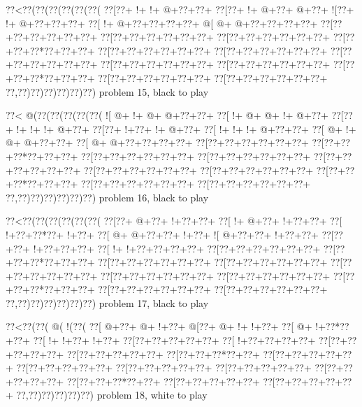 \vbox{\vbox{\goo
\0??<\0??(\0??(\0??(\0??(\0??(\0??(
\0??[\0??+\- !+\- !+\- @+\0??+\0??+
\0??[\0??+\- !+\- @+\0??+\- @+\0??+
\- ![\0??+\- !+\- @+\0??+\0??+\0??+
\0??[\- !+\- @+\0??+\0??+\0??+\0??+
\- @[\- @+\- @+\0??+\0??+\0??+\0??+
\0??[\0??+\0??+\0??+\0??+\0??+\0??+
\0??[\0??+\0??+\0??+\0??+\0??+\0??+
\0??[\0??+\0??+\0??+\0??+\0??+\0??+
\0??[\0??+\0??+\0??*\0??+\0??+\0??+
\0??[\0??+\0??+\0??+\0??+\0??+\0??+
\0??[\0??+\0??+\0??+\0??+\0??+\0??+
\0??[\0??+\0??+\0??+\0??+\0??+\0??+
\0??[\0??+\0??+\0??+\0??+\0??+\0??+
\0??[\0??+\0??+\0??+\0??+\0??+\0??+
\0??[\0??+\0??+\0??*\0??+\0??+\0??+
\0??[\0??+\0??+\0??+\0??+\0??+\0??+
\0??[\0??+\0??+\0??+\0??+\0??+\0??+
\0??,\0??)\0??)\0??)\0??)\0??)\0??)
}
\hfil problem 15, black to play\hfil\break
}

\vbox{\vbox{\goo
\0??<\- @(\0??(\0??(\0??(\0??(\0??(
\- ![\- @+\- !+\- @+\- @+\0??+\0??+
\0??[\- !+\- @+\- @+\- !+\- @+\0??+
\0??[\0??+\- !+\- !+\- !+\- @+\0??+
\0??[\0??+\- !+\0??+\- !+\- @+\0??+
\0??[\- !+\- !+\- !+\- @+\0??+\0??+
\0??[\- @+\- !+\- @+\- @+\0??+\0??+
\0??[\- @+\- @+\0??+\0??+\0??+\0??+
\0??[\0??+\0??+\0??+\0??+\0??+\0??+
\0??[\0??+\0??+\0??*\0??+\0??+\0??+
\0??[\0??+\0??+\0??+\0??+\0??+\0??+
\0??[\0??+\0??+\0??+\0??+\0??+\0??+
\0??[\0??+\0??+\0??+\0??+\0??+\0??+
\0??[\0??+\0??+\0??+\0??+\0??+\0??+
\0??[\0??+\0??+\0??+\0??+\0??+\0??+
\0??[\0??+\0??+\0??*\0??+\0??+\0??+
\0??[\0??+\0??+\0??+\0??+\0??+\0??+
\0??[\0??+\0??+\0??+\0??+\0??+\0??+
\0??,\0??)\0??)\0??)\0??)\0??)\0??)
}
\hfil problem 16, black to play\hfil\break
}

\vbox{\vbox{\goo
\0??<\0??(\0??(\0??(\0??(\0??(\0??(
\0??[\0??+\- @+\0??+\- !+\0??+\0??+
\0??[\- !+\- @+\0??+\- !+\0??+\0??+
\0??[\- !+\0??+\0??*\0??+\- !+\0??+
\0??[\- @+\- @+\0??+\0??+\- !+\0??+
\- ![\- @+\0??+\0??+\- !+\0??+\0??+
\0??[\0??+\0??+\- !+\0??+\0??+\0??+
\0??[\- !+\- !+\0??+\0??+\0??+\0??+
\0??[\0??+\0??+\0??+\0??+\0??+\0??+
\0??[\0??+\0??+\0??*\0??+\0??+\0??+
\0??[\0??+\0??+\0??+\0??+\0??+\0??+
\0??[\0??+\0??+\0??+\0??+\0??+\0??+
\0??[\0??+\0??+\0??+\0??+\0??+\0??+
\0??[\0??+\0??+\0??+\0??+\0??+\0??+
\0??[\0??+\0??+\0??+\0??+\0??+\0??+
\0??[\0??+\0??+\0??*\0??+\0??+\0??+
\0??[\0??+\0??+\0??+\0??+\0??+\0??+
\0??[\0??+\0??+\0??+\0??+\0??+\0??+
\0??,\0??)\0??)\0??)\0??)\0??)\0??)
}
\hfil problem 17, black to play\hfil\break
}

\vbox{\vbox{\goo
\0??<\0??(\0??(\- @(\- !(\0??(
\0??[\- @+\0??+\- @+\- !+\0??+
\- @[\0??+\- @+\- !+\- !+\0??+
\0??[\- @+\- !+\0??*\0??+\0??+
\0??[\- !+\- !+\0??+\- !+\0??+
\0??[\0??+\0??+\0??+\0??+\0??+
\0??[\- !+\0??+\0??+\0??+\0??+
\0??[\0??+\0??+\0??+\0??+\0??+
\0??[\0??+\0??+\0??+\0??+\0??+
\0??[\0??+\0??+\0??*\0??+\0??+
\0??[\0??+\0??+\0??+\0??+\0??+
\0??[\0??+\0??+\0??+\0??+\0??+
\0??[\0??+\0??+\0??+\0??+\0??+
\0??[\0??+\0??+\0??+\0??+\0??+
\0??[\0??+\0??+\0??+\0??+\0??+
\0??[\0??+\0??+\0??*\0??+\0??+
\0??[\0??+\0??+\0??+\0??+\0??+
\0??[\0??+\0??+\0??+\0??+\0??+
\0??,\0??)\0??)\0??)\0??)\0??)
}
\hfil problem 18, white to play\hfil\break
}

